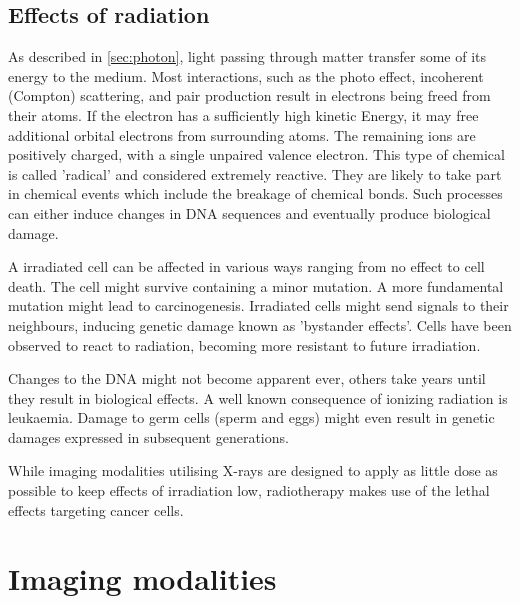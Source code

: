 \subsection{Effects of radiation}

As described in \ref{sec:photon}, light passing through matter transfer some of its energy to the medium.
Most interactions, such as the photo effect, incoherent (Compton) scattering, and pair production result in electrons being freed from their atoms.
If the electron has a sufficiently high kinetic Energy, it may free additional orbital electrons from surrounding atoms.
The remaining ions are positively charged, with a single unpaired valence electron.
This type of chemical is called 'radical' and considered extremely reactive.
They are likely to take part in chemical events which include the breakage of chemical bonds.
Such processes can either induce changes in DNA sequences and eventually produce biological damage.

A irradiated cell can be affected in various ways ranging from no effect to cell death.
The cell might survive containing a minor mutation.
A more fundamental mutation might lead to carcinogenesis.
Irradiated cells might send signals to their neighbours, inducing genetic damage known as 'bystander effects'.
Cells have been observed to react to radiation, becoming more resistant to future irradiation.

Changes to the DNA might not become apparent ever, others take years until they result in biological effects.
A well known consequence of ionizing radiation is leukaemia.
Damage to germ cells (sperm and eggs) might even result in genetic damages expressed in subsequent generations.

While imaging modalities utilising X-rays are designed to apply as little dose as possible to keep effects of irradiation low, radiotherapy makes use of the lethal effects targeting cancer cells.

\section{Imaging modalities}
